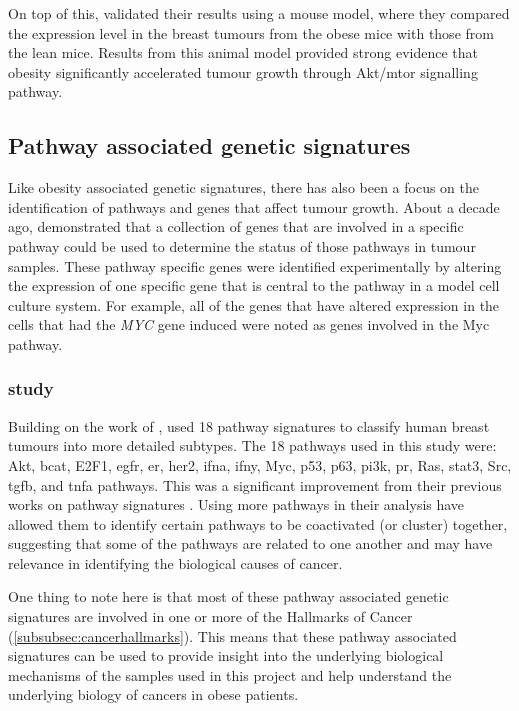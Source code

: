 On top of this, \citet{Fuentes-Mattei2014} validated their results using a mouse model, where they compared the expression level in the breast tumours from the obese mice with those from the lean mice.
Results from this animal model provided strong evidence that obesity significantly accelerated tumour growth through Akt/\gls{mtor} signalling pathway.

\subsection{Pathway associated genetic signatures}
\label{sub:pathway_associated_genetic_signatures}

Like obesity associated genetic signatures, there has also been a focus on the identification of pathways and genes that affect tumour growth.
About a decade ago, \citet{Bild2006} demonstrated that a collection of genes that are involved in a specific pathway could be used to determine the status of those pathways in tumour samples.
These pathway specific genes were identified experimentally by altering the expression of one specific gene that is central to the pathway in a model cell culture system.
For example, all of the genes that have altered expression in the cells that had  the \textit{MYC} gene induced were noted as genes involved in the Myc pathway.

\subsubsection{\citet{Gatza2010a} study}
\label{ssub:gatza_study}

Building on the work of \citet{Bild2006}, \citet{Gatza2010a} used 18 pathway signatures to classify human breast tumours into more detailed subtypes.
The 18 pathways used in this study were: Akt, \gls{bcat}, E2F1, \gls{egfr}, \gls{er}, \gls{her2}, \gls{ifna}, \gls{ifny}, Myc, p53, p63, \gls{pi3k}, \gls{pr}, Ras, \gls{stat3}, Src, \gls{tgfb}, and \gls{tnfa} pathways.
This was a significant improvement from their previous works on pathway signatures \citep{Bild2006,Bild2009}.
Using more pathways in their analysis have allowed them to identify certain pathways to be coactivated (or cluster) together, suggesting that some of the pathways are related to one another and may have relevance in identifying the biological causes of cancer.

One thing to note here is that most of these pathway associated genetic signatures are involved in one or more of the Hallmarks of Cancer (\cref{subsubsec:cancerhallmarks}).
This means that these pathway associated signatures can be used to provide insight into the underlying biological mechanisms of the samples used in this project and help understand the underlying biology of cancers in obese patients.

